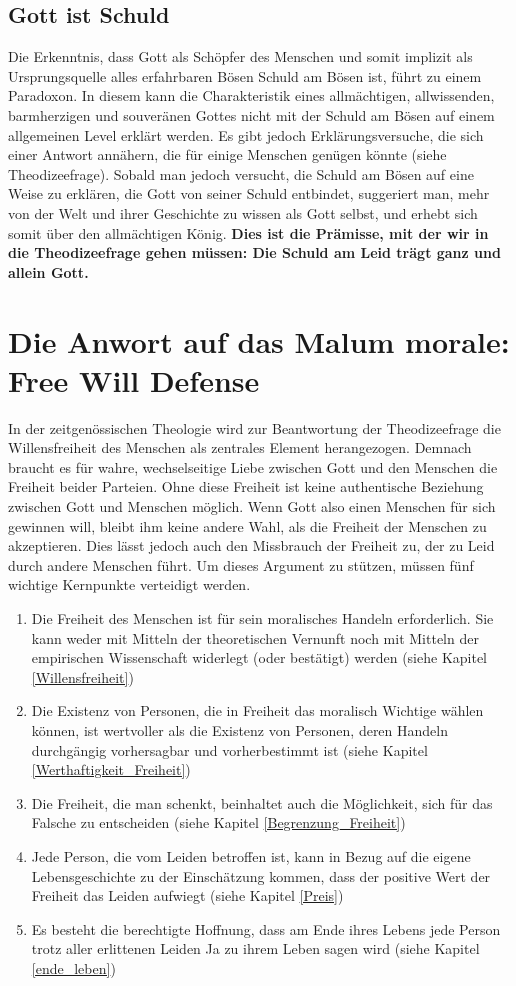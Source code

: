 \subsection{Gott ist Schuld}
Die Erkenntnis, dass Gott als Schöpfer des Menschen und somit implizit als Ursprungsquelle alles erfahrbaren Bösen Schuld am Bösen ist, führt zu einem Paradoxon. In diesem kann die Charakteristik eines allmächtigen, allwissenden, barmherzigen und souveränen Gottes nicht mit der Schuld am Bösen auf einem allgemeinen Level erklärt werden. Es gibt jedoch Erklärungsversuche, die sich einer Antwort annähern, die für einige Menschen genügen könnte (siehe Theodizeefrage). Sobald man jedoch versucht, die Schuld am Bösen auf eine Weise zu erklären, die Gott von seiner Schuld entbindet, suggeriert man, mehr von der Welt und ihrer Geschichte zu wissen als Gott selbst, und erhebt sich somit über den allmächtigen König. \textbf{Dies ist die Prämisse, mit der wir in die Theodizeefrage gehen müssen: Die Schuld am Leid trägt ganz und allein Gott.}

\section{Die Anwort auf das Malum morale: Free Will Defense} \label{free_will_defense}
In der zeitgenössischen Theologie wird zur Beantwortung der Theodizeefrage die Willensfreiheit des Menschen als zentrales Element herangezogen. Demnach braucht es für wahre, wechselseitige Liebe zwischen Gott und den Menschen die Freiheit beider Parteien. Ohne diese Freiheit ist keine authentische Beziehung zwischen Gott und Menschen möglich. Wenn Gott also einen Menschen für sich gewinnen will, bleibt ihm keine andere Wahl, als die Freiheit der Menschen zu akzeptieren. Dies lässt jedoch auch den Missbrauch der Freiheit zu, der zu Leid durch andere Menschen führt. Um dieses Argument zu stützen, müssen fünf wichtige Kernpunkte verteidigt werden.
\begin{enumerate}
	\item Die Freiheit des Menschen ist für sein moralisches Handeln erforderlich. Sie kann weder mit Mitteln der theoretischen Vernunft noch mit Mitteln der empirischen Wissenschaft widerlegt (oder bestätigt) werden (siehe Kapitel \ref{Willensfreiheit})
	\item Die Existenz von Personen, die in Freiheit das moralisch Wichtige wählen können, ist wertvoller als die Existenz von Personen, deren Handeln durchgängig vorhersagbar und vorherbestimmt ist (siehe Kapitel \ref{Werthaftigkeit_Freiheit})
	\item Die Freiheit, die man schenkt, beinhaltet auch die Möglichkeit, sich für das Falsche zu entscheiden (siehe Kapitel \ref{Begrenzung_Freiheit})
	\item Jede Person, die vom Leiden betroffen ist, kann in Bezug auf die eigene Lebensgeschichte zu der Einschätzung kommen, dass der positive Wert der Freiheit das Leiden aufwiegt (siehe Kapitel \ref{Preis})
	\item Es besteht die berechtigte Hoffnung, dass am Ende ihres Lebens jede Person trotz aller erlittenen Leiden Ja zu ihrem Leben sagen wird (siehe Kapitel \ref{ende_leben})
\end{enumerate}

